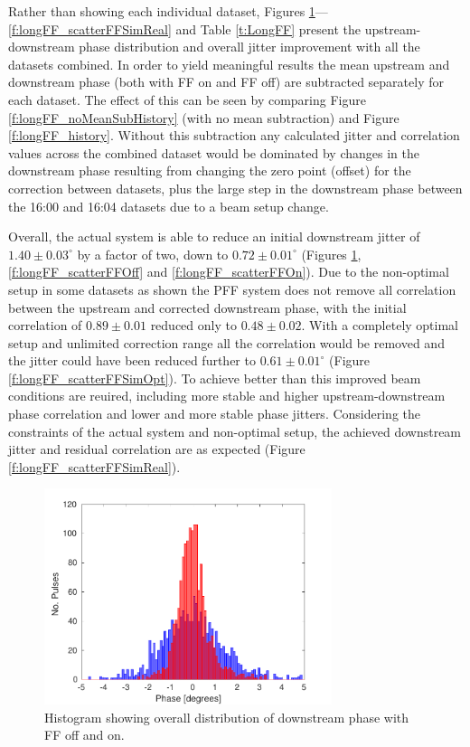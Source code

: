 Rather than showing each individual dataset, Figures \ref{f:longFF_histDownstreamPhase}---\ref{f:longFF_scatterFFSimReal} and Table \ref{t:LongFF} present the upstream-downstream phase distribution and overall jitter improvement with all the datasets combined. In order to yield meaningful results the mean upstream and downstream phase (both with FF on and FF off) are subtracted separately for each dataset. The effect of this can be seen by comparing Figure \ref{f:longFF_noMeanSubHistory} (with no mean subtraction) and Figure \ref{f:longFF_history}. Without this subtraction any calculated jitter and correlation values across the combined dataset would be dominated by changes in the downstream phase resulting from changing the zero point (offset) for the correction between datasets, plus the large step in the downstream phase between the 16:00 and 16:04 datasets due to a beam setup change. 

Overall, the actual system is able to reduce an initial downstream jitter of \(1.40\pm0.03^\circ\) by a factor of two, down to \(0.72\pm0.01^\circ\) (Figures \ref{f:longFF_histDownstreamPhase}, \ref{f:longFF_scatterFFOff} and \ref{f:longFF_scatterFFOn}). Due to the non-optimal setup in some datasets as shown the PFF system does not remove all correlation between the upstream and corrected downstream phase, with the initial correlation of \(0.89\pm0.01\) reduced only to \(0.48\pm0.02\). With a completely optimal setup and unlimited correction range all the correlation would be removed and the jitter could have been reduced further to \(0.61\pm0.01^\circ\) (Figure \ref{f:longFF_scatterFFSimOpt}). To achieve better than this improved beam conditions are reuired, including more stable and higher upstream-downstream phase correlation and lower and more stable phase jitters. Considering the constraints of the actual system and non-optimal setup, the achieved downstream jitter and residual correlation are as expected (Figure \ref{f:longFF_scatterFFSimReal}).

\begin{figure}
  \centering
  \includegraphics[width=0.75\textwidth]{Figures/feedforward/longFF_histDownstreamPhase}
  \caption{Histogram showing overall distribution of downstream phase with FF off and on.}
  \label{f:longFF_histDownstreamPhase}
\end{figure}

